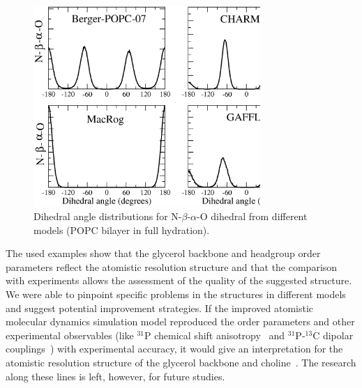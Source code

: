 \documentclass[journal=jpcbfk,manuscript=article]{achemso}
\begin{document}
\begin{figure}[]
  \centering
  \includegraphics[width=8.6cm]{../Fig/a-bDIHS2.eps}
  \caption{\label{dihDISTS2}
    Dihedral angle distributions for N-$\beta$-$\alpha$-O dihedral from different models (POPC bilayer in full hydration).
  } 
\end{figure}

The used examples show that the glycerol backbone and headgroup order parameters reflect the atomistic resolution structure
and that the comparison with experiments allows the assessment of the quality of the suggested structure. We were able to pinpoint
specific problems in the structures in different models and suggest potential improvement strategies.
If the improved atomistic
molecular dynamics simulation model reproduced the order parameters and other experimental observables 
(like $^{31}$P chemical shift anisotropy~\cite{chowdhary13} and $^{31}$P-$^{13}$C dipolar couplings~\cite{prakash10})
with experimental accuracy, it would give an interpretation for the atomistic resolution structure of the glycerol backbone and 
choline~\cite{seelig77b,skarjune79,jacobs80,davis83,akutsu91,hong95b,semchyschyn04}. The research along these lines is left, however,
for future studies.
\end{document}
